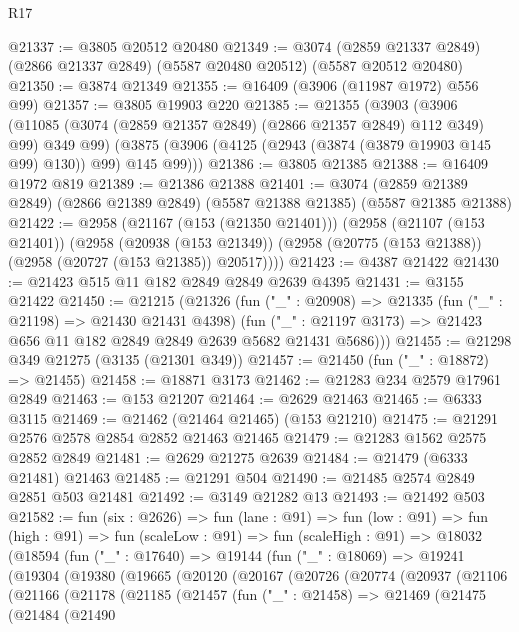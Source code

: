\begin{lexlean}{R17}
\begin{coremodule}
@21337 := @3805 @20512 @20480
@21349 := @3074
    (@2859 @21337 @2849)
    (@2866 @21337 @2849)
    (@5587 @20480 @20512)
    (@5587 @20512 @20480)
@21350 := @3874 @21349
@21355 := @16409 (@3906 (@11987 @1972) @556 @99)
@21357 := @3805 @19903 @220
@21385 := @21355
    (@3903
      (@3906 (@11085 (@3074 (@2859 @21357 @2849) (@2866 @21357 @2849) @112 @349) @99) @349 @99)
      (@3875 (@3906 (@4125 (@2943 (@3874 (@3879 @19903 @145 @99) @130)) @99) @145 @99)))
@21386 := @3805 @21385
@21388 := @16409 @1972 @819
@21389 := @21386 @21388
@21401 := @3074
    (@2859 @21389 @2849)
    (@2866 @21389 @2849)
    (@5587 @21388 @21385)
    (@5587 @21385 @21388)
@21422 := @2958
    (@21167 (@153 (@21350 @21401)))
    (@2958
      (@21107 (@153 @21401))
      (@2958
        (@20938 (@153 @21349))
        (@2958 (@20775 (@153 @21388)) (@2958 (@20727 (@153 @21385)) @20517))))
@21423 := @4387 @21422
@21430 := @21423 @515 @11 @182 @2849 @2849 @2639 @4395
@21431 := @3155 @21422
@21450 := @21215
    (@21326
      (fun ("_" : @20908) =>
      @21335
        (fun ("_" : @21198) => @21430 @21431 @4398)
        (fun ("_" : @21197 @3173) => @21423 @656 @11 @182 @2849 @2849 @2639 @5682 @21431 @5686)))
@21455 := @21298 @349 @21275 (@3135 (@21301 @349))
@21457 := @21450 (fun ("_" : @18872) => @21455)
@21458 := @18871 @3173
@21462 := @21283 @234 @2579 @17961 @2849
@21463 := @153 @21207
@21464 := @2629 @21463
@21465 := @6333 @3115
@21469 := @21462 (@21464 @21465) (@153 @21210)
@21475 := @21291 @2576 @2578 @2854 @2852 @21463 @21465
@21479 := @21283 @1562 @2575 @2852 @2849
@21481 := @2629 @21275 @2639
@21484 := @21479 (@6333 @21481) @21463
@21485 := @21291 @504
@21490 := @21485 @2574 @2849 @2851 @503 @21481
@21492 := @3149 @21282 @13
@21493 := @21492 @503
@21582 := fun (six : @2626) =>
  fun (lane : @91) =>
  fun (low : @91) =>
  fun (high : @91) =>
  fun (scaleLow : @91) =>
  fun (scaleHigh : @91) =>
  @18032
    (@18594
      (fun ("_" : @17640) =>
      @19144
        (fun ("_" : @18069) =>
        @19241
          (@19304
            (@19380
              (@19665
                (@20120
                  (@20167
                    (@20726
                      (@20774
                        (@20937
                          (@21106
                            (@21166
                              (@21178
                                (@21185
                                  (@21457
                                    (fun ("_" : @21458) =>
                                    @21469
                                      (@21475
                                        (@21484
                                          (@21490

\end{coremodule}
\end{lexlean}
